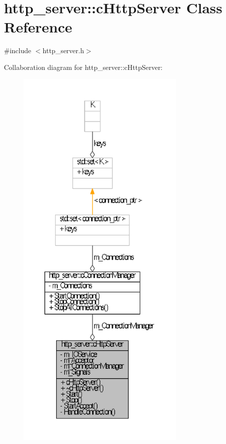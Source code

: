 \hypertarget{classhttp__server_1_1cHttpServer}{\section{http\-\_\-server\-:\-:c\-Http\-Server \-Class \-Reference}
\label{classhttp__server_1_1cHttpServer}
}


{\ttfamily \#include $<$http\-\_\-server.\-h$>$}



\-Collaboration diagram for http\-\_\-server\-:\-:c\-Http\-Server\-:
\nopagebreak
\begin{figure}[H]
\begin{center}
\leavevmode
\includegraphics[height=550pt]{classhttp__server_1_1cHttpServer__coll__graph}
\end{center}
\end{figure}
